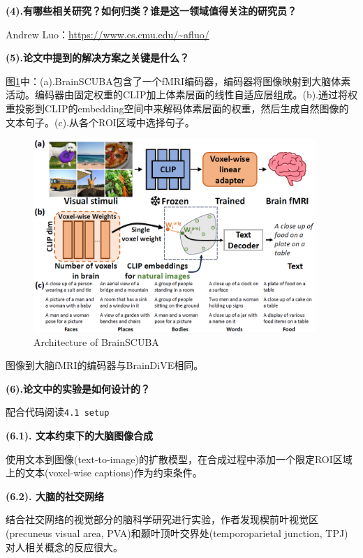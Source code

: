 \documentclass[12pt, a4paper, oneside]{ctexart}
\begin{document}
    \noindent\textbf{(4).有哪些相关研究？如何归类？谁是这一领域值得关注的研究员？}

    Andrew Luo：\url{https://www.cs.cmu.edu/~afluo/}

    \noindent\textbf{(5).论文中提到的解决方案之关键是什么？}

    图\ref{Architecture_of_BrainSCUBA}中：(a).BrainSCUBA包含了一个fMRI编码器，编码器将图像映射到大脑体素活动。编码器由固定权重的CLIP加上体素层面的线性自适应层组成。(b).通过将权重投影到CLIP的embedding空间中来解码体素层面的权重，然后生成自然图像的文本句子。(c).从各个ROI区域中选择句子。

    \begin{figure}[htbp]
        \centering
        \includegraphics[width=0.95\textwidth]{pic/4.12_Architecture_of_BrainSCUBA.png}
        \caption{Architecture of BrainSCUBA}
        \label{Architecture_of_BrainSCUBA}
    \end{figure}

    图像到大脑fMRI的编码器与BrainDiVE\cite{luo2023brain}相同。

    \noindent\textbf{(6).论文中的实验是如何设计的？}

    配合代码阅读\texttt{4.1 setup}

    \noindent\textbf{(6.1). 文本约束下的大脑图像合成}

    使用文本到图像(text-to-image)的扩散模型，在合成过程中添加一个限定ROI区域上的文本(voxel-wise captions)作为约束条件。

    \noindent\textbf{(6.2). 大脑的社交网络}

    结合社交网络的视觉部分的脑科学研究进行实验，作者发现楔前叶视觉区(precuneus visual area, PVA)和颞叶顶叶交界处(temporoparietal junction, TPJ)对人相关概念的反应很大。
\end{document}
